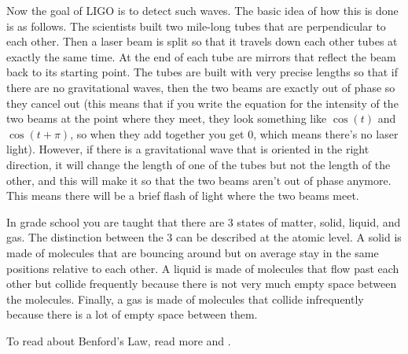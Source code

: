  \vspace{0.2cm}

Now the goal of LIGO is to detect such waves. The basic idea of how this is done is as follows. The scientists built two mile-long tubes that are perpendicular to each other. Then a laser beam is split so that it travels down each other tubes at exactly the same time. At the end of each tube are mirrors that reflect the beam back to its starting point. The tubes are built with very precise lengths so that if there are no gravitational waves, then the two beams are exactly out of phase so they cancel out (this means that if you write the equation for the intensity of the two beams at the point where they meet, they look something like $\cos(t)$ and $\cos(t + \pi)$, so when they add together you get 0, which means there's no laser light). However, if there is a gravitational wave that is oriented in the right direction, it will change the length of one of the tubes but not the length of the other, and this will make it so that the two beams aren't out of phase anymore. This means there will be a brief flash of light where the two beams meet. \\


In grade school you are taught that there are 3 states of matter, solid, liquid, and gas. The distinction between the 3 can be described at the atomic level. A solid is made of molecules that are bouncing around but on average stay in the same positions relative to each other. A liquid is made of molecules that flow past each other but collide frequently because there is not very much empty space between the molecules. Finally, a gas is made of molecules that collide infrequently because there is a lot of empty space between them.


To read about Benford's Law, read more  and . 


























